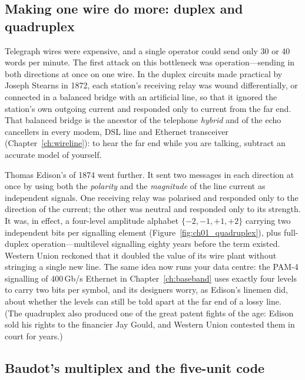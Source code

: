 \subsection{Making one wire do more: duplex and quadruplex}

Telegraph wires were expensive, and a single operator could send only 30 or 40 words per
minute. The first attack on this bottleneck was  operation---sending in both directions
at once on one wire. In the duplex circuits made practical by Joseph Stearns in 1872, each station's
receiving relay was wound differentially, or connected in a balanced bridge with an artificial line,
so that it ignored the station's own outgoing current and responded only to current from the far
end. That balanced bridge is the ancestor of the telephone \emph{hybrid} and of the echo cancellers
in every modem, DSL line and Ethernet transceiver (Chapter~\ref{ch:wireline}): to hear the far end
while you are talking, subtract an accurate model of yourself.

Thomas Edison's  of 1874 went further. It sent two messages in each direction at
once by using both the \emph{polarity} and the \emph{magnitude} of the line current as independent
signals. One receiving relay was polarised and responded only to the direction of the current; the
other was neutral and responded only to its strength. It was, in effect, a four-level amplitude
alphabet $\{-2,-1,+1,+2\}$ carrying two independent bits per signalling element
(Figure~\ref{fig:ch01_quadruplex}), plus full-duplex operation---multilevel signalling eighty years
before the term existed. Western Union reckoned that it doubled the value of its wire plant without
stringing a single new line. The same idea now runs your data centre: the PAM-4 signalling of 400\,Gb/s
Ethernet in Chapter~\ref{ch:baseband} uses exactly four levels to carry two bits per symbol, and its
designers worry, as Edison's linemen did, about whether the levels can still be told apart at the far
end of a lossy line. (The quadruplex also produced one of the great patent fights of the age: Edison
sold his rights to the financier Jay Gould, and Western Union contested them in court for years.)

\subsection{Baudot's multiplex and the five-unit code}
\label{sec:ch01:baudot}

